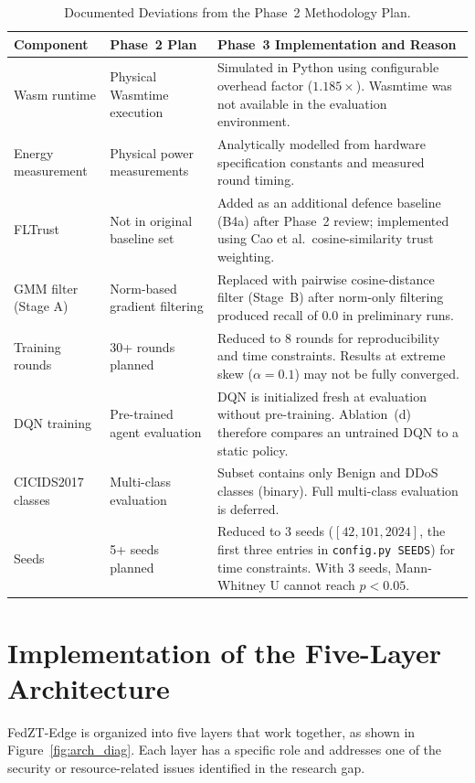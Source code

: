 \documentclass[11pt,a4paper]{article}
\newcommand{\bigsection}[1]{\FloatBarrier\Needspace*{0.22\textheight}\section{#1}}
\begin{document}
\begin{table}[htbp]
\centering
\caption{Documented Deviations from the Phase~2 Methodology Plan.}
\label{tab:deviations}
\small
\begin{tabularx}{\textwidth}{lYY}
\toprule
\textbf{Component} & \textbf{Phase~2 Plan} & \textbf{Phase~3 Implementation and Reason} \\
\midrule
Wasm runtime & Physical Wasmtime execution & Simulated in Python using configurable overhead factor ($1.185\times$). Wasmtime was not available in the evaluation environment. \\
Energy measurement & Physical power measurements & Analytically modelled from hardware specification constants and measured round timing. \\
FLTrust & Not in original baseline set & Added as an additional defence baseline (B4a) after Phase~2 review; implemented using Cao et al.\ cosine-similarity trust weighting. \\
GMM filter (Stage A) & Norm-based gradient filtering & Replaced with pairwise cosine-distance filter (Stage~B) after norm-only filtering produced recall of $0.0$ in preliminary runs. \\
Training rounds & 30+ rounds planned & Reduced to 8 rounds for reproducibility and time constraints. Results at extreme skew ($\alpha=0.1$) may not be fully converged. \\
DQN training & Pre-trained agent evaluation & DQN is initialized fresh at evaluation without pre-training. Ablation~(d) therefore compares an untrained DQN to a static policy. \\
CICIDS2017 classes & Multi-class evaluation & Subset contains only Benign and DDoS classes (binary). Full multi-class evaluation is deferred. \\
Seeds & 5+ seeds planned & Reduced to 3 seeds ($[42, 101, 2024]$, the first three entries in \texttt{config.py SEEDS}) for time constraints. With 3 seeds, Mann-Whitney U cannot reach $p < 0.05$. \\
\bottomrule
\end{tabularx}
\end{table}
\FloatBarrier

\bigsection{Implementation of the Five-Layer Architecture}\label{sec:impl}

FedZT-Edge is organized into five layers that work together, as shown in Figure~\ref{fig:arch_diag}. Each layer has a specific role and addresses one of the security or resource-related issues identified in the research gap.
\end{document}
